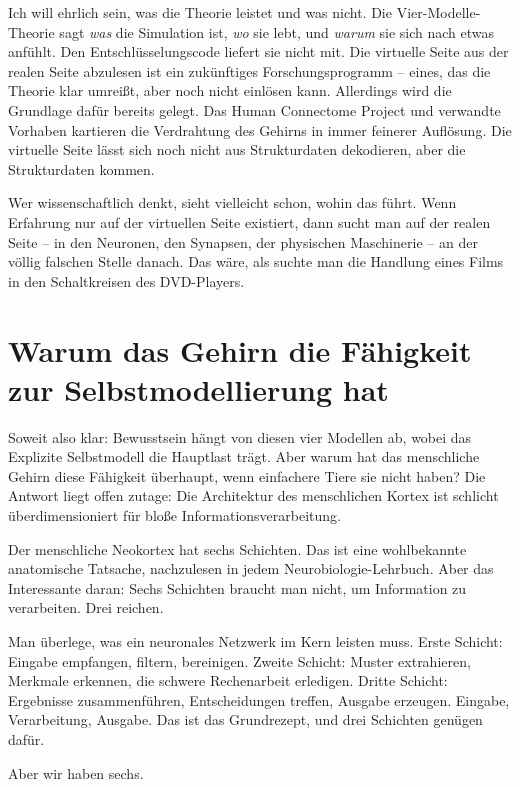 \documentclass[11pt, twoside, openright]{book}
\begin{document}
Ich will ehrlich sein, was die Theorie leistet und was nicht. Die Vier-Modelle-Theorie sagt \textit{was} die Simulation ist, \textit{wo} sie lebt, und \textit{warum} sie sich nach etwas anfühlt. Den Entschlüsselungscode liefert sie nicht mit. Die virtuelle Seite aus der realen Seite abzulesen ist ein zukünftiges Forschungsprogramm -- eines, das die Theorie klar umreißt, aber noch nicht einlösen kann. Allerdings wird die Grundlage dafür bereits gelegt. Das Human Connectome Project und verwandte Vorhaben kartieren die Verdrahtung des Gehirns in immer feinerer Auflösung. Die virtuelle Seite lässt sich noch nicht aus Strukturdaten dekodieren, aber die Strukturdaten kommen.

Wer wissenschaftlich denkt, sieht vielleicht schon, wohin das führt. Wenn Erfahrung nur auf der virtuellen Seite existiert, dann sucht man auf der realen Seite -- in den Neuronen, den Synapsen, der physischen Maschinerie -- an der völlig falschen Stelle danach. Das wäre, als suchte man die Handlung eines Films in den Schaltkreisen des DVD-Players.

\section*{Warum das Gehirn die Fähigkeit\\zur Selbstmodellierung hat}

Soweit also klar: Bewusstsein hängt von diesen vier Modellen ab, wobei das Explizite Selbstmodell die Hauptlast trägt. Aber warum hat das menschliche Gehirn diese Fähigkeit überhaupt, wenn einfachere Tiere sie nicht haben? Die Antwort liegt offen zutage: Die Architektur des menschlichen Kortex ist schlicht überdimensioniert für bloße Informationsverarbeitung.

Der menschliche Neokortex hat sechs Schichten. Das ist eine wohlbekannte anatomische Tatsache, nachzulesen in jedem Neurobiologie-Lehrbuch. Aber das Interessante daran: Sechs Schichten braucht man nicht, um Information zu verarbeiten. Drei reichen.

Man überlege, was ein neuronales Netzwerk im Kern leisten muss. Erste Schicht: Eingabe empfangen, filtern, bereinigen. Zweite Schicht: Muster extrahieren, Merkmale erkennen, die schwere Rechenarbeit erledigen. Dritte Schicht: Ergebnisse zusammenführen, Entscheidungen treffen, Ausgabe erzeugen. Eingabe, Verarbeitung, Ausgabe. Das ist das Grundrezept, und drei Schichten genügen dafür.

Aber wir haben sechs.
\end{document}
